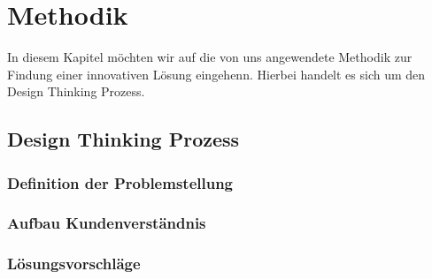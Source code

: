 \newpage

\section{Methodik} \label{anwendung}
In diesem Kapitel möchten wir auf die von uns angewendete Methodik zur Findung einer innovativen Lösung eingehenn. Hierbei handelt es sich um den Design Thinking Prozess.

\subsection{Design Thinking Prozess} \label{designThinking}

\subsubsection{Definition der Problemstellung} \label{definitionProblemstellung}

\subsubsection{Aufbau Kundenverständnis} \label{aufbauKundenverstaendnis}

\subsubsection{Lösungsvorschläge} \label{loesungsvorschlaege}
